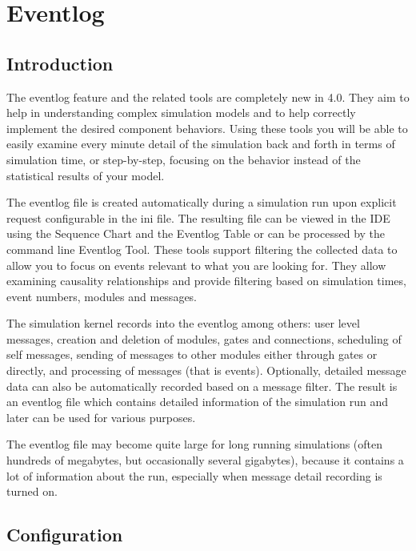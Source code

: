 \chapter{Eventlog}
\label{cha:eventlog}

\section{Introduction}
The eventlog feature and the related tools are completely new in {\opp} 4.0. They aim to
help in understanding complex simulation models and to help correctly implement the
desired component behaviors. Using these tools you will be able to easily examine every
minute detail of the simulation back and forth in terms of simulation time, or step-by-step,
focusing on the behavior instead of the statistical results of your model.

The eventlog file is created automatically during a simulation run upon explicit request
configurable in the ini file. The resulting file can be viewed in the {\opp} IDE using
the Sequence Chart and the Eventlog Table or can be processed by the command line Eventlog
Tool. These tools support filtering the collected data to allow you to focus on events
relevant to what you are looking for. They allow examining causality relationships and
provide filtering based on simulation times, event numbers, modules and messages.

The simulation kernel records into the eventlog among others: user level messages,
creation and deletion of modules, gates and connections, scheduling of self messages,
sending of messages to other modules either through gates or directly, and processing of
messages (that is events). Optionally, detailed message data can also be automatically
recorded based on a message filter. The result is an eventlog file which contains detailed
information of the simulation run and later can be used for various purposes.

\begin{note}
    The eventlog file may become quite large for long running simulations
    (often hundreds of megabytes, but occasionally several gigabytes), because it
    contains a lot of information about the run, especially when message detail
    recording is turned on.
\end{note}

\section{Configuration}

